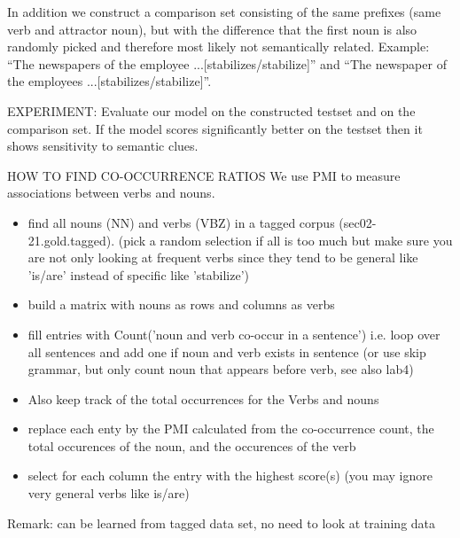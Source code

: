 In addition we construct a comparison set consisting of the same prefixes
(same verb and attractor noun),
but with the difference that the first noun is also randomly picked and
therefore most likely not semantically related. Example:
``The newspapers of the employee ...[stabilizes/stabilize]'' and 
``The newspaper of the employees ...[stabilizes/stabilize]''.


EXPERIMENT:
Evaluate our model on the constructed testset and on the comparison set.
If the model scores significantly better on the testset
then it shows sensitivity to semantic clues.


HOW TO FIND CO-OCCURRENCE RATIOS
We use PMI to measure associations between verbs and nouns.


\begin{itemize}
\item find all nouns (NN) and verbs (VBZ) in a tagged corpus 
(sec02-21.gold.tagged).
(pick a random selection if all is too much
but make sure you are not only looking at
frequent verbs since they tend to be general like 'is/are'
instead of specific like 'stabilize')
\item  build a matrix with nouns as rows and columns as verbs
\item  fill entries with Count('noun and verb co-occur in a sentence')
i.e. loop over all sentences and add one if noun and verb exists in sentence
(or use skip grammar, but only count noun that appears before verb, see also lab4)
\item  Also keep track of the total occurrences for the Verbs and nouns
\item replace each enty by the PMI calculated from the 
co-occurrence count, the total occurences of the noun, and the occurences
of the verb
\item select for each column the entry with the highest score(s)
(you may ignore very general verbs like is/are)
\end{itemize}

Remark: can be learned from tagged data set, no need to look at training data




